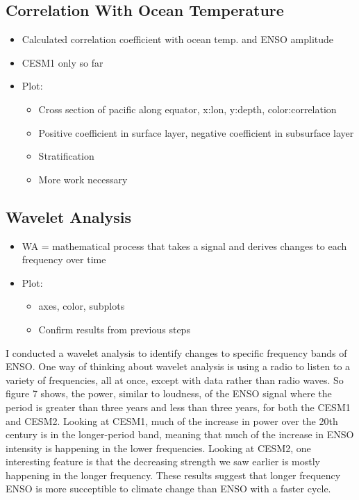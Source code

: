\documentclass[little]{basic}
\begin{document}
\subsection*{Correlation With Ocean Temperature}
\label{sec:org403aa1c}
\begin{itemize}
\item Calculated correlation coefficient with ocean temp. and ENSO amplitude
\item CESM1 only so far
\item Plot:
\begin{itemize}
\item Cross section of pacific along equator, x:lon, y:depth, color:correlation
\item Positive coefficient in surface layer, negative coefficient in subsurface layer
\item Stratification
\item More work necessary
\end{itemize}
\end{itemize}
\subsection*{Wavelet Analysis}
\label{sec:orgb0f8166}
\begin{itemize}
\item WA = mathematical process that takes a signal and derives changes to each frequency over time
\item Plot:
\begin{itemize}
\item axes, color, subplots
\item Confirm results from previous steps
\end{itemize}
\end{itemize}

I conducted a wavelet analysis to identify changes to specific frequency bands of ENSO. One way of thinking about wavelet analysis is using a radio to listen to a variety of frequencies, all at once, except with data rather than radio waves. So figure 7 shows, the power, similar to loudness, of the ENSO signal where the period is greater than three years and less than three years, for both the CESM1 and CESM2. Looking at CESM1, much of the increase in power over the 20th century is in the longer-period band, meaning that much of the increase in ENSO intensity is happening in the lower frequencies. Looking at CESM2, one interesting feature is that the decreasing strength we saw earlier is mostly happening in the longer frequency. These results suggest that longer frequency ENSO is more succeptible to climate change than ENSO with a faster cycle.
\end{document}
